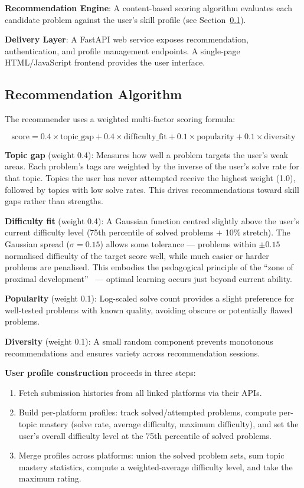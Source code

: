 \documentclass[12pt,a4paper]{article}
\begin{document}
\textbf{Recommendation Engine}: A content-based scoring algorithm evaluates each candidate problem against the user's skill profile (see Section~\ref{sec:recscore}).

\textbf{Delivery Layer}: A FastAPI web service exposes recommendation, authentication, and profile management endpoints. A single-page HTML/JavaScript frontend provides the user interface.

\subsection{Recommendation Algorithm}
\label{sec:recscore}

The recommender uses a weighted multi-factor scoring formula:

\begin{equation}
\text{score} = 0.4 \times \text{topic\_gap} + 0.4 \times \text{difficulty\_fit} + 0.1 \times \text{popularity} + 0.1 \times \text{diversity}
\end{equation}

\textbf{Topic gap} (weight 0.4): Measures how well a problem targets the user's weak areas. Each problem's tags are weighted by the inverse of the user's solve rate for that topic. Topics the user has never attempted receive the highest weight (1.0), followed by topics with low solve rates. This drives recommendations toward skill gaps rather than strengths.

\textbf{Difficulty fit} (weight 0.4): A Gaussian function centred slightly above the user's current difficulty level (75th percentile of solved problems $+$ 10\% stretch). The Gaussian spread ($\sigma = 0.15$) allows some tolerance --- problems within $\pm 0.15$ normalised difficulty of the target score well, while much easier or harder problems are penalised. This embodies the pedagogical principle of the ``zone of proximal development''~\cite{vygotsky1978} --- optimal learning occurs just beyond current ability.

\textbf{Popularity} (weight 0.1): Log-scaled solve count provides a slight preference for well-tested problems with known quality, avoiding obscure or potentially flawed problems.

\textbf{Diversity} (weight 0.1): A small random component prevents monotonous recommendations and ensures variety across recommendation sessions.

\textbf{User profile construction} proceeds in three steps:
\begin{enumerate}
    \item Fetch submission histories from all linked platforms via their APIs.
    \item Build per-platform profiles: track solved/attempted problems, compute per-topic mastery (solve rate, average difficulty, maximum difficulty), and set the user's overall difficulty level at the 75th percentile of solved problems.
    \item Merge profiles across platforms: union the solved problem sets, sum topic mastery statistics, compute a weighted-average difficulty level, and take the maximum rating.
\end{enumerate}
\end{document}
